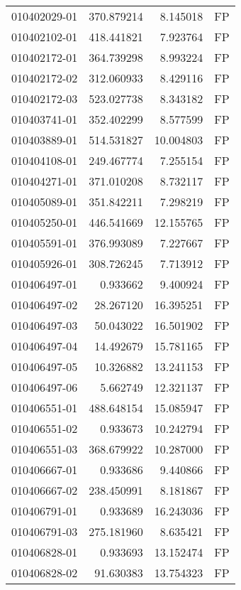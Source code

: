 \begin{tabular}{lrrl}
010402029-01 &  370.879214 &       8.145018 &   FP \\
010402102-01 &  418.441821 &       7.923764 &   FP \\
010402172-01 &  364.739298 &       8.993224 &   FP \\
010402172-02 &  312.060933 &       8.429116 &   FP \\
010402172-03 &  523.027738 &       8.343182 &   FP \\
010403741-01 &  352.402299 &       8.577599 &   FP \\
010403889-01 &  514.531827 &      10.004803 &   FP \\
010404108-01 &  249.467774 &       7.255154 &   FP \\
010404271-01 &  371.010208 &       8.732117 &   FP \\
010405089-01 &  351.842211 &       7.298219 &   FP \\
010405250-01 &  446.541669 &      12.155765 &   FP \\
010405591-01 &  376.993089 &       7.227667 &   FP \\
010405926-01 &  308.726245 &       7.713912 &   FP \\
010406497-01 &    0.933662 &       9.400924 &   FP \\
010406497-02 &   28.267120 &      16.395251 &   FP \\
010406497-03 &   50.043022 &      16.501902 &   FP \\
010406497-04 &   14.492679 &      15.781165 &   FP \\
010406497-05 &   10.326882 &      13.241153 &   FP \\
010406497-06 &    5.662749 &      12.321137 &   FP \\
010406551-01 &  488.648154 &      15.085947 &   FP \\
010406551-02 &    0.933673 &      10.242794 &   FP \\
010406551-03 &  368.679922 &      10.287000 &   FP \\
010406667-01 &    0.933686 &       9.440866 &   FP \\
010406667-02 &  238.450991 &       8.181867 &   FP \\
010406791-01 &    0.933689 &      16.243036 &   FP \\
010406791-03 &  275.181960 &       8.635421 &   FP \\
010406828-01 &    0.933693 &      13.152474 &   FP \\
010406828-02 &   91.630383 &      13.754323 &   FP \\

\end{tabular}
